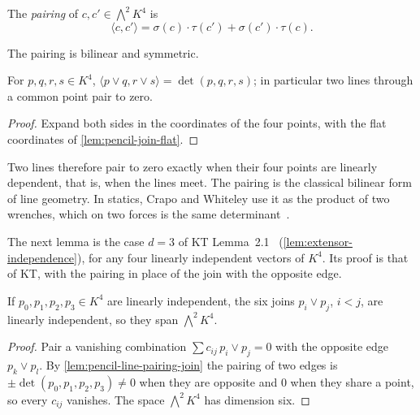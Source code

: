 \begin{definition}
  \label{def:pencil-line-pairing}
  \leanok
  The \emph{pairing} of $c, c' \in \bigwedge^2 K^4$ is
  \[
    \langle c, c' \rangle = \sigma(c) \cdot \tau(c') + \sigma(c') \cdot \tau(c).
  \]
\end{definition}

The pairing is bilinear and symmetric.

\begin{lemma}
  \label{lem:pencil-line-pairing-join}
  \leanok
  For $p, q, r, s \in K^4$,
  $\langle p \vee q, r \vee s \rangle = \det(p, q, r, s)$; in
  particular two lines through a common point pair to zero.
\end{lemma}
\begin{proof}
  \leanok
  Expand both sides in the coordinates of the four points, with the flat
  coordinates of \cref{lem:pencil-join-flat}.
\end{proof}

Two lines therefore pair to zero exactly when their four points are
linearly dependent, that is, when the lines meet. The pairing is the
classical bilinear form of line geometry. In statics, Crapo and Whiteley
use it as the product of two wrenches, which on two forces is the same
determinant~\cite[Examples~2.4--2.5, pp.~49--50]{crapoWhiteley1982}.

The next lemma is the case $d = 3$ of KT
Lemma~2.1~\cite[pp.~651--652]{katohTanigawa2011}
(\cref{lem:extensor-independence}), for any four linearly independent
vectors of $K^4$. Its proof is that of KT, with the pairing in place of
the join with the opposite edge.

\begin{lemma}
  \label{lem:pencil-tetrahedron}
  \leanok
  If $p_0, p_1, p_2, p_3 \in K^4$ are linearly independent, the six joins
  $p_i \vee p_j$, $i < j$, are linearly independent, so they span
  $\bigwedge^2 K^4$.
\end{lemma}
\begin{proof}
  \leanok
  Pair a vanishing combination $\sum c_{ij}\, p_i \vee p_j = 0$ with the
  opposite edge $p_k \vee p_l$. By \cref{lem:pencil-line-pairing-join}
  the pairing of two edges is $\pm \det(p_0, p_1, p_2, p_3) \neq 0$ when
  they are opposite and $0$ when they share a point, so every $c_{ij}$
  vanishes. The space $\bigwedge^2 K^4$ has dimension six.
\end{proof}

